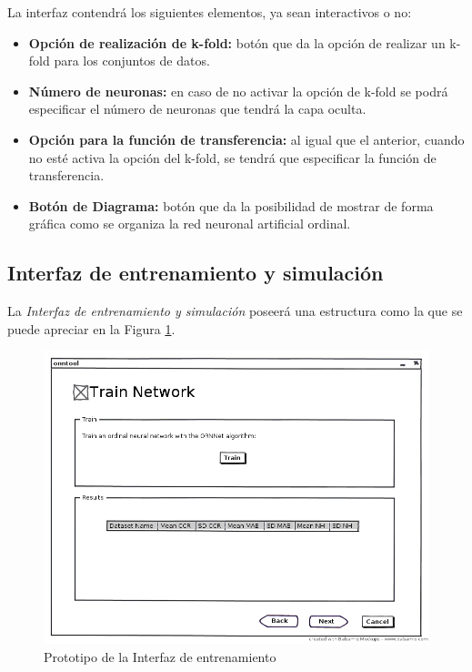 			La interfaz contendrá los siguientes elementos, ya sean interactivos o no:
			
			\begin{itemize}
				\item \textbf{Opción de realización de k-fold:} botón que da la opción de realizar un k-fold para los conjuntos de datos.
				\item \textbf{Número de neuronas:} en caso de no activar la opción de k-fold se podrá especificar el número de neuronas que tendrá la capa oculta.
				\item \textbf{Opción para la función de transferencia:} al igual que el anterior, cuando no esté activa la opción del k-fold, se tendrá que especificar la función de transferencia.
				\item \textbf{Botón de Diagrama:} botón que da la posibilidad de mostrar de forma gráfica como se organiza la red neuronal artificial ordinal.
			\end{itemize}
			
		\subsection{Interfaz de entrenamiento y simulación}
		
			La \textit{Interfaz de entrenamiento y simulación} poseerá una estructura como la que se puede apreciar en la Figura \ref{fig:int3}.\\
			
			\begin{figure}[htbp]
				\centering
				\includegraphics[scale=0.5]{interfaz/Interfaz_train.png}
				\caption{Prototipo de la Interfaz de entrenamiento}
				\label{fig:int3}
			\end{figure}
			
